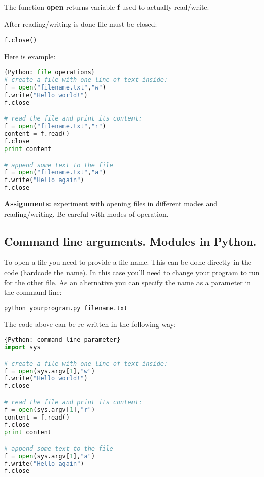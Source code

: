 The function \textbf{open} returns variable \textbf{f} used to actually
read/write.

After reading/writing is done file must be closed:

\bigskip
\lstinline{f.close()}
\bigskip

Here is example:

\begin{lstlisting}[language=Python,style=codelst]{Python: file operations}
# create a file with one line of text inside:
f = open("filename.txt","w")
f.write("Hello world!")
f.close

# read the file and print its content:
f = open("filename.txt","r")
content = f.read()
f.close
print content

# append some text to the file
f = open("filename.txt","a")
f.write("Hello again")
f.close
\end{lstlisting}

\begin{tcolorbox}
\textbf{Assignments:}
experiment with opening files in different modes
and reading/writing. Be careful with modes of operation.
\end{tcolorbox}

\subsection{Command line arguments. Modules in Python.}

To open a file you need to provide a file name. This can be done
directly in the code (hardcode the name). In this case you'll need to change
your program to run for the other file. As an alternative you can
specify the name as a parameter in the command line:

\begin{lstlisting}[language=bash,frame=single]
python yourprogram.py filename.txt
\end{lstlisting}

The code above can be re-written in the following way:

\begin{lstlisting}[language=Python,style=codelst]{Python: command line parameter}
import sys

# create a file with one line of text inside:
f = open(sys.argv[1],"w")
f.write("Hello world!")
f.close

# read the file and print its content:
f = open(sys.argv[1],"r")
content = f.read()
f.close
print content

# append some text to the file
f = open(sys.argv[1],"a")
f.write("Hello again")
f.close

\end{lstlisting}

